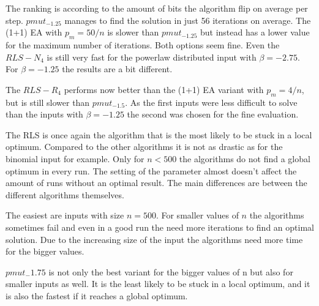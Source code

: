 The ranking is according to the amount of bits the algorithm flip on average per step.
$pmut_{-1.25}$ manages to find the solution in just 56 iterations on average.
The (1+1) EA with $p_m=50/n$ is slower than $pmut_{-1.25}$ but instead has a lower value for the maximum number of iterations.
Both options seem fine.
Even the $RLS-N_4$ is still very fast for the powerlaw distributed input with $\beta = -2.75$.
For $\beta = -1.25$ the results are a bit different.



The $RLS-R_4$ performs now better than the (1+1) EA variant with $p_m=4/n$, but is still slower than $pmut_{-1.5}$.
As the first inputs were less difficult to solve than the inputs with $\beta = -1.25$ the second was chosen for the fine evaluation.



The RLS is once again the algorithm that is the most likely to be stuck in a local optimum.
Compared to the other algorithms it is not as drastic as for the binomial input for example.
Only for $n<500$ the algorithms do not find a global optimum in every run.
The setting of the parameter almost doesn't affect the amount of runs without an optimal result.
The main differences are between the different algorithms themselves.



The easiest are inputs with size $n=500$.
For smaller values of $n$ the algorithms sometimes fail and even in a good run the need more iterations to find an optimal solution.
Due to the increasing size of the input the algorithms need more time for the bigger values.



$pmut_-1.75$ is not only the best variant for the bigger values of n but also for smaller inputs as well.
It is the least likely to be stuck in a local optimum, and it is also the fastest if it reaches a global optimum.